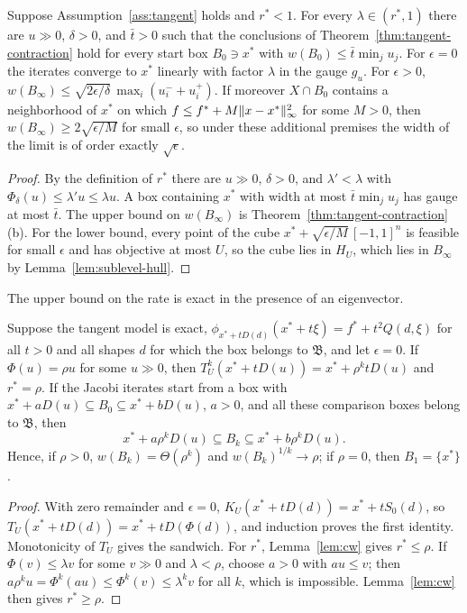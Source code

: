 \begin{corollary}\label{cor:tangent-rate}
Suppose Assumption~\ref{ass:tangent} holds and $r^*<1$. For every
$\lambda\in(r^*,1)$ there are $u\gg0$, $\delta>0$, and $\bar t>0$ such that
the conclusions of Theorem~\ref{thm:tangent-contraction} hold for every
start box $B_0\ni x^*$ with $w(B_0)\le\bar t\min_ju_j$. For $\epsilon=0$ the
iterates converge to $x^*$ linearly with factor $\lambda$ in the gauge
$g_u$. For $\epsilon>0$,
$w(B_\infty)\le\sqrt{2\epsilon/\delta}\,\max_i(u_i^-+u_i^+)$. If moreover
$X\cap B_0$ contains a neighborhood of $x^*$ on which
$f\le f^*+M\lVert x-x^*\rVert_\infty^2$ for some $M>0$, then
$w(B_\infty)\ge2\sqrt{\epsilon/M}$ for small $\epsilon$, so under these
additional premises the width of the limit is of order exactly
$\sqrt\epsilon$.
\end{corollary}

\begin{proof}
By the definition of $r^*$ there are $u\gg0$, $\delta>0$, and
$\lambda'<\lambda$ with $\Phi_\delta(u)\le\lambda'u\le\lambda u$. A box
containing $x^*$ with width at most $\bar t\min_ju_j$ has gauge at most
$\bar t$. The upper bound on $w(B_\infty)$ is
Theorem~\ref{thm:tangent-contraction}(b). For the lower bound, every point
of the cube $x^*+\sqrt{\epsilon/M}\,[-1,1]^n$ is feasible for small
$\epsilon$ and has objective at most $U$, so the cube lies in $H_U$, which
lies in $B_\infty$ by Lemma~\ref{lem:sublevel-hull}.
\end{proof}

The upper bound on the rate is exact in the presence of an eigenvector.

\begin{proposition}\label{prop:tangent-eigenrate}
Suppose the tangent model is exact,
$\phi_{x^*+tD(d)}(x^*+t\xi)=f^*+t^2Q(d,\xi)$ for all $t>0$ and all shapes
$d$ for which the box belongs to $\mathfrak B$, and let $\epsilon=0$. If
$\Phi(u)=\rho u$ for some $u\gg0$, then
$T_U^k(x^*+tD(u))=x^*+\rho^ktD(u)$ and $r^*=\rho$. If the Jacobi iterates
start from a box with $x^*+aD(u)\subseteq B_0\subseteq x^*+bD(u)$, $a>0$, and
all these comparison boxes belong to $\mathfrak B$, then
\[
  x^*+a\rho^kD(u)\subseteq B_k\subseteq x^*+b\rho^kD(u).
\]
Hence, if $\rho>0$, $w(B_k)=\Theta(\rho^k)$ and $w(B_k)^{1/k}\to\rho$; if
$\rho=0$, then $B_1=\{x^*\}$.
\end{proposition}

\begin{proof}
With zero remainder and $\epsilon=0$, $K_U(x^*+tD(d))=x^*+tS_0(d)$, so
$T_U(x^*+tD(d))=x^*+tD(\Phi(d))$, and induction proves the first identity.
Monotonicity of $T_U$ gives the sandwich. For $r^*$, Lemma~\ref{lem:cw}
gives $r^*\le\rho$. If $\Phi(v)\le\lambda v$ for some $v\gg0$ and
$\lambda<\rho$, choose $a>0$ with $au\le v$; then
$a\rho^ku=\Phi^k(au)\le\Phi^k(v)\le\lambda^kv$ for all $k$, which is
impossible. Lemma~\ref{lem:cw} then gives $r^*\ge\rho$.
\end{proof}

